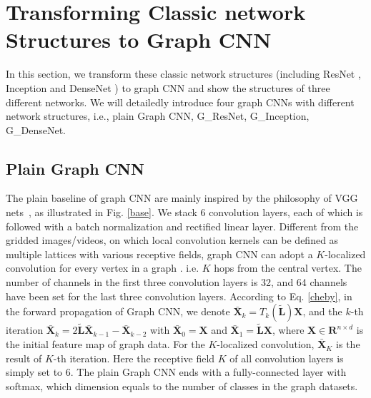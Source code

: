 \documentclass[journal]{IEEEtran}
\begin{document}
\section{Transforming Classic network Structures to Graph CNN}
\label{sec:StruToGraCNN}
In this section, we transform these classic network structures (including ResNet \cite{resnet}, Inception \cite{googleLeNet} and DenseNet \cite{densenet}) to graph CNN and show the structures of  three different networks. We will detailedly introduce four graph CNNs with different network structures, i.e., plain Graph CNN, G\_ResNet, G\_Inception, G\_DenseNet.

\subsection{Plain Graph CNN}
The plain baseline of graph CNN are mainly inspired by the philosophy of VGG nets~\cite{vgg}, as illustrated in Fig. \ref{base}.
We stack 6 convolution layers, each of which is followed with a batch normalization and rectified linear layer.
Different from the gridded images/videos, on which local convolution kernels can be defined as multiple lattices with various receptive fields, graph CNN can adopt a $K$-localized convolution for every vertex in a graph \cite{defferrard2016conv}. i.e. $K$ hops from the central vertex.
The number of channels in the first three convolution layers is 32, and 64 channels have been set for the last three convolution layers.
According to Eq. \ref{cheby}, in the forward propagation of Graph CNN, we denote $\mathbf{\bar{X}}_k = T_k ( \mathbf{\tilde{L}})\mathbf{X}$, and the $k$-th iteration $\mathbf{\bar{X}}_k = 2 \mathbf{\tilde{L}\bar{X}}_{k-1} - \mathbf{\bar{X}}_{k-2}$ with $\mathbf{\bar{X}}_0 = \mathbf{X}$ and $\mathbf{\bar{X}}_1 = \mathbf{\tilde{L}X}$, where $\mathbf{X}\in\mathbf{R}^{{n}\times{d}}$ is the initial feature map of graph data. For the $K$-localized convolution, $\mathbf{\bar{X}}_K$ is the result of $K$-th iteration.
Here the receptive field $K$ of all convolution layers is simply set to $6$.
The plain Graph CNN ends with a fully-connected layer with softmax, which dimension equals to the number of classes in the graph datasets.
\end{document}
